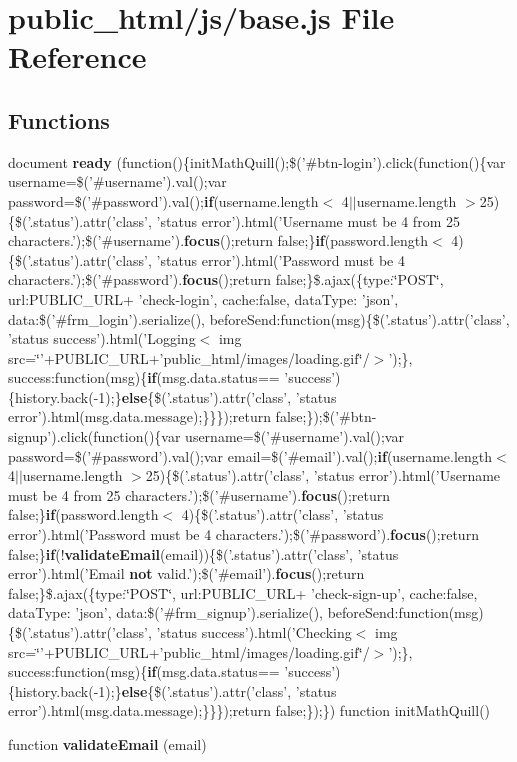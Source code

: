 \section{public\-\_\-html/js/base.js File Reference}
\label{base_8js}
\subsection*{Functions}
\begin{DoxyCompactItemize}
\item 
document {\bf ready} (function()\{init\-Math\-Quill();\$('\#btn-\/login').click(function()\{var username=\$('\#username').val();var password=\$('\#password').val();{\bf if}(username.\-length$<$ 4$|$$|$username.\-length $>$25)\{\$('.status').attr('class', 'status error').html('Username must be 4 from 25 characters.');\$('\#username').{\bf focus}();return false;\}{\bf if}(password.\-length$<$ 4)\{\$('.status').attr('class', 'status error').html('Password must be 4 characters.');\$('\#password').{\bf focus}();return false;\}\$.ajax(\{type\-:\char`\"{}P\-O\-S\-T\char`\"{}, url\-:\-P\-U\-B\-L\-I\-C\-\_\-\-U\-R\-L+ 'check-\/login', cache\-:false, data\-Type\-: 'json', data\-:\$('\#frm\-\_\-login').serialize(), before\-Send\-:function(msg)\{\$('.status').attr('class', 'status success').html('Logging$<$ img src=\char`\"{}'+P\-U\-B\-L\-I\-C\-\_\-\-U\-R\-L+'public\-\_\-html/images/loading.\-gif\char`\"{}/$>$');\}, success\-:function(msg)\{{\bf if}(msg.\-data.\-status== 'success')\{history.\-back(-\/1);\}{\bf else}\{\$('.status').attr('class', 'status error').html(msg.\-data.\-message);\}\}\});return false;\});\$('\#btn-\/signup').click(function()\{var username=\$('\#username').val();var password=\$('\#password').val();var email=\$('\#email').val();{\bf if}(username.\-length$<$ 4$|$$|$username.\-length $>$25)\{\$('.status').attr('class', 'status error').html('Username must be 4 from 25 characters.');\$('\#username').{\bf focus}();return false;\}{\bf if}(password.\-length$<$ 4)\{\$('.status').attr('class', 'status error').html('Password must be 4 characters.');\$('\#password').{\bf focus}();return false;\}{\bf if}(!{\bf validate\-Email}(email))\{\$('.status').attr('class', 'status error').html('Email {\bf not} valid.');\$('\#email').{\bf focus}();return false;\}\$.ajax(\{type\-:\char`\"{}P\-O\-S\-T\char`\"{}, url\-:\-P\-U\-B\-L\-I\-C\-\_\-\-U\-R\-L+ 'check-\/sign-\/up', cache\-:false, data\-Type\-: 'json', data\-:\$('\#frm\-\_\-signup').serialize(), before\-Send\-:function(msg)\{\$('.status').attr('class', 'status success').html('Checking$<$ img src=\char`\"{}'+P\-U\-B\-L\-I\-C\-\_\-\-U\-R\-L+'public\-\_\-html/images/loading.\-gif\char`\"{}/$>$');\}, success\-:function(msg)\{{\bf if}(msg.\-data.\-status== 'success')\{history.\-back(-\/1);\}{\bf else}\{\$('.status').attr('class', 'status error').html(msg.\-data.\-message);\}\}\});return false;\});\}) function init\-Math\-Quill()
\item 
function {\bf validate\-Email} (email)
\end{DoxyCompactItemize}


